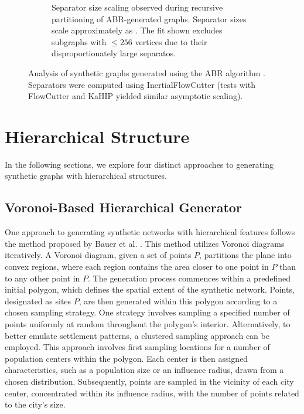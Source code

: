 \begin{figure}[tbhp]
\begin{subfigure}{0.55\linewidth}
		\caption{Separator size scaling observed during recursive partitioning of ABR-generated graphs. Separator sizes scale approximately as . The fit shown excludes subgraphs with \( \le 256 \) vertices due to their disproportionately large separatos.}
		\label{fig:abr_graph_sep_plot}
	\end{subfigure}
	\caption{Analysis of synthetic graphs generated using the ABR algorithm \cite{abraham_highway_2010}. Separators were computed using InertialFlowCutter (tests with FlowCutter and KaHIP yielded similar asymptotic scaling).}
	\label{fig:abr_graph_separators}
\end{figure}

\section{Hierarchical Structure}

In the following sections, we explore four distinct approaches to generating synthetic graphs with hierarchical structures.

\subsection{Voronoi-Based Hierarchical Generator}

One approach to generating synthetic networks with hierarchical features follows the method proposed by Bauer et al. \cite{hutchison_synthetic_2010}.
This method utilizes Voronoi diagrams iteratively.
A Voronoi diagram, given a set of points \(P\), partitions the plane into convex regions, where each region contains the area closer to one point in \(P\) than to any other point in \(P\).
The generation process commences within a predefined initial polygon, which defines the spatial extent of the synthetic network.
Points, designated as sites \(P\), are then generated within this polygon according to a chosen sampling strategy.
One strategy involves sampling a specified number of points uniformly at random throughout the polygon's interior.
Alternatively, to better emulate settlement patterns, a clustered sampling approach can be employed.
This approach involves first sampling locations for a number of population centers within the polygon.
Each center is then assigned characteristics, such as a population size or an influence radius, drawn from a chosen distribution.
Subsequently, points are sampled in the vicinity of each city center, concentrated within its influence radius, with the number of points related to the city's size.

